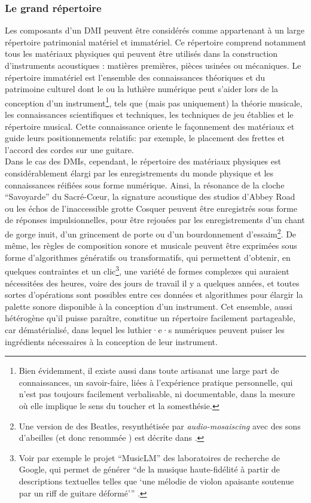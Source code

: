 \subsubsection{Le grand répertoire}

\noindent Les composants d'un \gls{DMI} peuvent être considérés comme appartenant à un large répertoire patrimonial matériel et immatériel. Ce répertoire comprend notamment tous les matériaux physiques qui peuvent être utilisés dans la construction d'instruments acoustiques : matières premières, pièces usinées ou mécaniques. Le répertoire immatériel est l'ensemble des connaissances théoriques et du patrimoine culturel dont le ou la luthière numérique peut s'aider lors de la conception d'un instrument\footnote{Bien évidemment, il existe aussi dans toute artisanat une large part de connaissances, un savoir-faire, liées à l'expérience pratique personnelle, qui n'est pas toujours facilement verbalisable, ni documentable, dans la mesure où elle implique le sens du toucher et la somesthésie.}, tels que (mais pas uniquement) la théorie musicale, les connaissances scientifiques et techniques, les techniques de jeu établies et le répertoire musical. Cette connaissance oriente le façonnement des matériaux et guide leurs positionnements relatifs: par exemple, le placement des frettes et l'accord des cordes sur une guitare.\\
\indent Dans le cas des \glspl{DMI}, cependant, le répertoire des matériaux physiques est considérablement élargi par les enregistrements du monde physique et les connaissances réifiées sous forme numérique. Ainsi, la résonance de la cloche ``Savoyarde'' du Sacré-Cœur, la signature acoustique des studios d'Abbey Road ou les échos de l'inaccessible grotte Cosquer peuvent être enregistrés sous forme de réponses impulsionnelles, pour être rejouées par les enregistrements d'un chant de gorge inuit, d'un grincement de porte ou d'un bourdonnement d'essaim\footnote{Une version de  des Beatles, resynthétisée par \textit{audio-mosaiscing} avec des sons d'abeilles (et donc renommée ) est décrite dans \cite{driedger_let_2015}.}. De même, les règles de composition sonore et musicale peuvent être exprimées sous forme d'algorithmes génératifs ou transformatifs, qui permettent d'obtenir, en quelques contraintes et un clic\footnote{Voir par exemple le projet ``MusicLM'' des laboratoires de recherche de Google, qui permet de générer ``de la musique haute-fidélité à partir de descriptions textuelles telles que `une mélodie de violon apaisante soutenue par un riff de guitare déformé''' \cite{agostinelli_musiclm_2023}.}, une variété de formes complexes qui auraient nécessitées des heures, voire des jours de travail il y a quelques années, et toutes sortes d'opérations sont possibles entre ces données et algorithmes pour élargir la palette sonore disponible à la conception d'un instrument. Cet ensemble, aussi hétérogène qu'il puisse paraître, constitue un répertoire facilement partageable, car dématérialisé, dans lequel les luthier·e·s numériques peuvent puiser les ingrédients nécessaires à la conception de leur instrument.

